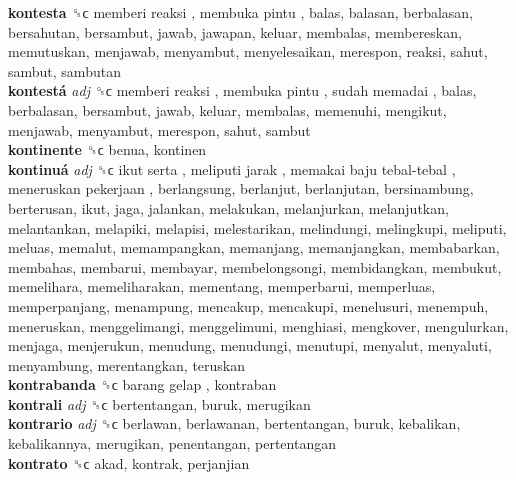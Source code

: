 \textbf{kontesta} ␝ϲ   memberi reaksi ,  membuka pintu , balas, balasan, berbalasan, bersahutan, bersambut, jawab, jawapan, keluar, membalas, membereskan, memutuskan, menjawab, menyambut, menyelesaikan, merespon, reaksi, sahut, sambut, sambutan  \\
\textbf{kontestá} \emph{adj}  ␝ϲ   memberi reaksi ,  membuka pintu ,  sudah memadai , balas, berbalasan, bersambut, jawab, keluar, membalas, memenuhi, mengikut, menjawab, menyambut, merespon, sahut, sambut  \\
\textbf{kontinente} ␝ϲ  benua, kontinen  \\
\textbf{kontinuá} \emph{adj}  ␝ϲ   ikut serta ,  meliputi jarak ,  memakai baju tebal-tebal ,  meneruskan pekerjaan , berlangsung, berlanjut, berlanjutan, bersinambung, berterusan, ikut, jaga, jalankan, melakukan, melanjurkan, melanjutkan, melantankan, melapiki, melapisi, melestarikan, melindungi, melingkupi, meliputi, meluas, memalut, memampangkan, memanjang, memanjangkan, membabarkan, membahas, membarui, membayar, membelongsongi, membidangkan, membukut, memelihara, memeliharakan, mementang, memperbarui, memperluas, memperpanjang, menampung, mencakup, mencakupi, menelusuri, menempuh, meneruskan, menggelimangi, menggelimuni, menghiasi, mengkover, mengulurkan, menjaga, menjerukun, menudung, menudungi, menutupi, menyalut, menyaluti, menyambung, merentangkan, teruskan  \\
\textbf{kontrabanda} ␝ϲ   barang gelap , kontraban  \\
\textbf{kontrali} \emph{adj}  ␝ϲ  bertentangan, buruk, merugikan  \\
\textbf{kontrario} \emph{adj}  ␝ϲ  berlawan, berlawanan, bertentangan, buruk, kebalikan, kebalikannya, merugikan, penentangan, pertentangan  \\
\textbf{kontrato} ␝ϲ  akad, kontrak, perjanjian  \\
